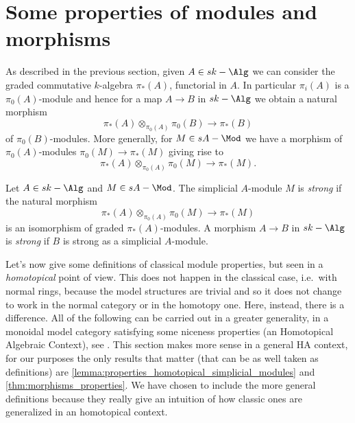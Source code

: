     \section{Some properties of modules and morphisms}
        As described in the previous section, given $A \in sk-\Alg$ we can consider the graded commutative $k$-algebra $\pi_*(A)$, functorial in $A$. In particular $\pi_i(A)$ is a $\pi_0(A)$-module and hence for a map $A \to B$ in $sk-\Alg$ we obtain a natural morphism \[\pi_*(A) \otimes_{\pi_0(A)} \pi_0(B) \to \pi_*(B) \] of $\pi_0(B)$-modules. More generally, for $M \in sA-\Mod$ we have a morphism of $\pi_0(A)$-modules $\pi_0(M) \to \pi_*(M)$ giving rise to \[\pi_*(A) \otimes_{\pi_0(A)} \pi_0(M) \to \pi_*(M). \]
        \begin{defn}
            \label{defn:strong_module}
            Let $A \in sk-\Alg$ and $M \in sA-\Mod$. The simplicial $A$-module $M$ is \emph{strong} if the natural morphism \[\pi_*(A) \otimes_{\pi_0(A)} \pi_0(M) \to \pi_*(M) \] is an isomorphism of graded $\pi_*(A)$-modules.
            A morphism $A \to B$ in $sk-\Alg$ is \emph{strong} if $B$ is strong as a simplicial $A$-module.
        \end{defn}
        Let's now give some definitions of classical module properties, but seen in a \emph{homotopical} point of view. This does not happen in the classical case, i.e.\ with normal rings, because the model structures are trivial and so it does not change to work in the normal category or in the homotopy one. Here, instead, there is a difference. All of the following can be carried out in a greater generality, in a monoidal model category satisfying some niceness properties (an Homotopical Algebraic Context), see \cite[Part~1]{ToVe:hag2}. 
        This section makes more sense in a general HA context, for our purposes the only results that matter (that can be as well taken as definitions) are \cref{lemma:properties_homotopical_simplicial_modules} and \cref{thm:morphisms_properties}. We have chosen to include the more general definitions because they really give an intuition of how classic ones are generalized in an homotopical context.

